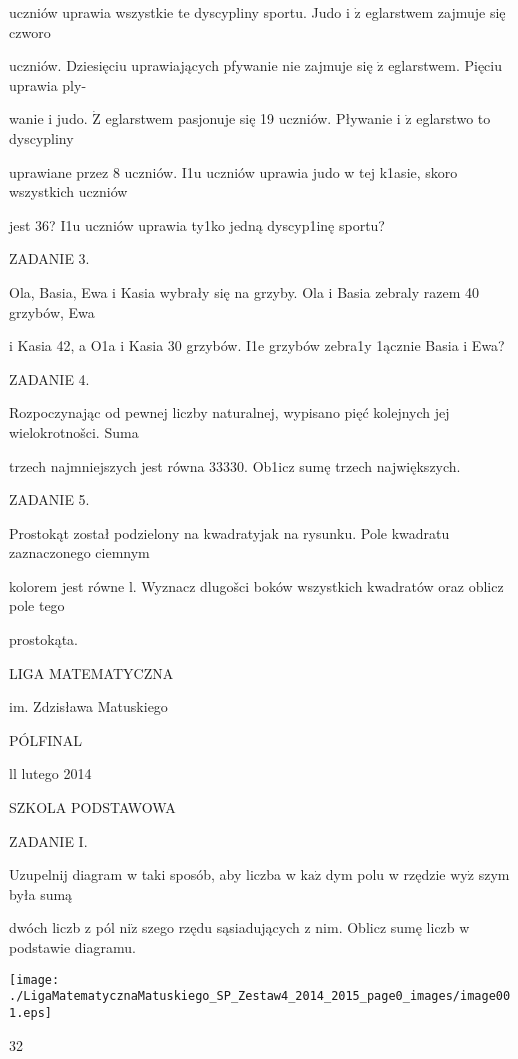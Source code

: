 \documentclass[a4paper,12pt]{article}
\begin{document}
uczniów uprawia wszystkie te dyscypliny sportu. Judo i $\dot{\mathrm{z}}$ eglarstwem zajmuje się czworo

uczniów. Dziesięciu uprawiających pfywanie nie zajmuje się $\dot{\mathrm{z}}$ eglarstwem. Pięciu uprawia ply-

wanie i judo. $\dot{\mathrm{Z}}$ eglarstwem pasjonuje się 19 uczniów. Pływanie i $\dot{\mathrm{z}}$ eglarstwo to dyscypliny

uprawiane przez 8 uczniów. I1u uczniów uprawia judo w tej k1asie, skoro wszystkich uczniów

jest 36? I1u uczniów uprawia ty1ko jedną dyscyp1inę sportu?

ZADANIE 3.

Ola, Basia, Ewa i Kasia wybrały się na grzyby. Ola i Basia zebraly razem 40 grzybów, Ewa

i Kasia 42, a O1a i Kasia 30 grzybów. I1e grzybów zebra1y 1ącznie Basia i Ewa?

ZADANIE 4.

Rozpoczynając od pewnej liczby naturalnej, wypisano pięć kolejnych jej wielokrotnošci. Suma

trzech najmniejszych jest równa 33330. Ob1icz sumę trzech największych.

ZADANIE 5.

Prostokąt został podzielony na kwadratyjak na rysunku. Pole kwadratu zaznaczonego ciemnym

kolorem jest równe l. Wyznacz dlugošci boków wszystkich kwadratów oraz oblicz pole tego

prostokąta.






LIGA MATEMATYCZNA

im. Zdzisława Matuskiego

PÓLFINAL

ll lutego 2014

SZKOLA PODSTAWOWA

ZADANIE I.

Uzupelnij diagram w taki sposób, aby liczba w $\mathrm{k}\mathrm{a}\dot{\mathrm{z}}$ dym polu w rzędzie $\mathrm{w}\mathrm{y}\dot{\mathrm{z}}$ szym była sumą

dwóch liczb z pól $\mathrm{n}\mathrm{i}\dot{\mathrm{z}}$ szego rzędu sąsiadujących z nim. Oblicz sumę liczb w podstawie diagramu.
\begin{center}
\texttt{[image: ./LigaMatematycznaMatuskiego\_SP\_Zestaw4\_2014\_2015\_page0\_images/image001.eps]}
\end{center}
32
\end{document}
